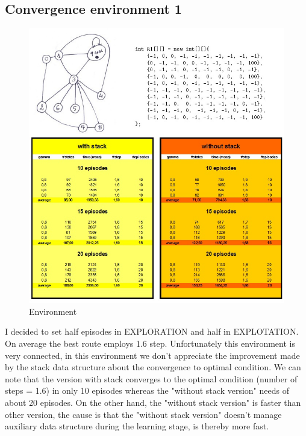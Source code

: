 \documentclass[a4paper]{article}
\begin{document}
\subsection{Convergence environment 1}
\begin{figure}[htbp]
\begin{center}
\includegraphics[scale=0.75]{env1.jpg}
\caption{Environment}
\end{center}
\end{figure}
I decided to set half episodes in EXPLORATION and half in EXPLOTATION.
On average the best route employs 1.6 step. 
Unfortunately this environment is very connected, in this environment we don't appreciate the improvement made by the stack data structure about the convergence to optimal condition.
We can note that the version with stack converges to the optimal condition (number of steps = 1.6) in only 10 episodes whereas the "without stack version" needs of about 20 episodes.
On the other hand, the "without stack version" is faster than other version, the cause is that the "without stack version" doesn't manage auxiliary data structure during the learning stage, is thereby more fast.
\end{document}
